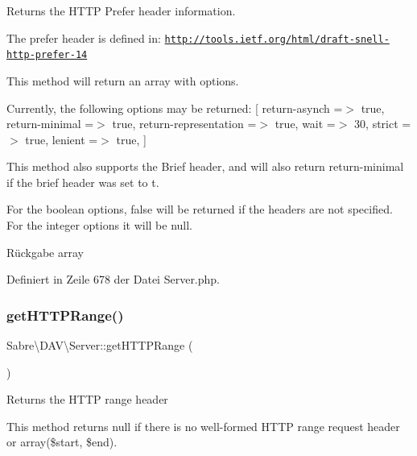 Returns the H\+T\+TP Prefer header information.

The prefer header is defined in\+: \href{http://tools.ietf.org/html/draft-snell-http-prefer-14}{\tt http\+://tools.\+ietf.\+org/html/draft-\/snell-\/http-\/prefer-\/14}

This method will return an array with options.

Currently, the following options may be returned\+: \mbox{[} \textquotesingle{}return-\/asynch\textquotesingle{} =$>$ true, \textquotesingle{}return-\/minimal\textquotesingle{} =$>$ true, \textquotesingle{}return-\/representation\textquotesingle{} =$>$ true, \textquotesingle{}wait\textquotesingle{} =$>$ 30, \textquotesingle{}strict\textquotesingle{} =$>$ true, \textquotesingle{}lenient\textquotesingle{} =$>$ true, \mbox{]}

This method also supports the Brief header, and will also return \textquotesingle{}return-\/minimal\textquotesingle{} if the brief header was set to \textquotesingle{}t\textquotesingle{}.

For the boolean options, false will be returned if the headers are not specified. For the integer options it will be \textquotesingle{}null\textquotesingle{}.

\begin{DoxyReturn}{Rückgabe}
array 
\end{DoxyReturn}


Definiert in Zeile 678 der Datei Server.\+php.

\mbox{\label{class_sabre_1_1_d_a_v_1_1_server_ae8c4a77fdab337aaa99d039d8e88226d}} 
\subsubsection{\texorpdfstring{get\+H\+T\+T\+P\+Range()}{getHTTPRange()}}
{\footnotesize\ttfamily Sabre\textbackslash{}\+D\+A\+V\textbackslash{}\+Server\+::get\+H\+T\+T\+P\+Range (\begin{DoxyParamCaption}{ }\end{DoxyParamCaption})}

Returns the H\+T\+TP range header

This method returns null if there is no well-\/formed H\+T\+TP range request header or array(\$start, \$end).

